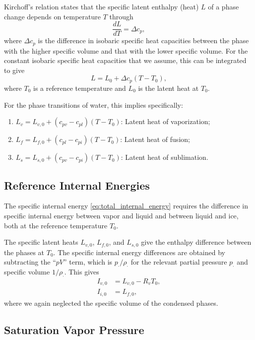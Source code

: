 \documentclass{article}
\begin{document}
Kirchoff's relation states that the specific latent enthalpy (heat) $L$ of a phase change depends on temperature $T$ through
\begin{equation}
    \frac{dL}{dT} = \Delta c_p,
\end{equation}
where $\Delta c_p$ is the difference in isobaric specific heat capacities between the phase with the higher specific volume and that with the lower specific volume. For the constant isobaric specific heat capacities that we assume, this can be integrated to give
\begin{equation}
    L = L_0 + \Delta c_p (T-T_0),
    \label{eq:LH_temperature}
\end{equation}
where $T_0$ is a reference temperature and $L_0$ is the latent heat at $T_0$. 

For the phase transitions of water, this implies specifically:
\begin{enumerate}
    \item $L_v = L_{v,0} + (c_{pv} - c_{pl}) (T - T_0)$: Latent heat of vaporization;
    \item $L_f = L_{f,0} + (c_{pl} - c_{pi}) (T - T_0)$: Latent heat of fusion;
    \item $L_s = L_{s,0} + (c_{pv} - c_{pi}) (T - T_0)$: Latent heat of sublimation.
\end{enumerate}

\subsection{Reference Internal Energies}

The specific internal energy \eqref{eq:total_internal_energy} requires the difference in specific internal energy between vapor and liquid and between liquid and ice, both at the reference temperature $T_0$. 

The specific latent heats $L_{v,0}$, $L_{f,0}$, and $L_{s,0}$ give the enthalpy difference between the phases at $T_0$. The specific internal energy differences are obtained by subtracting the ``$pV$'' term, which is $p_\cdot/\rho_\cdot$ for the relevant partial pressure $p_\cdot$ and specific volume $1/\rho_\cdot$. This gives
\begin{align}
     I_{v,0} &= L_{v, 0} - R_v T_0,\\
     I_{i,0} &= L_{f, 0},
\end{align}
where we again neglected the specific volume of the condensed phases. 
   
\subsection{Saturation Vapor Pressure}
\end{document}
